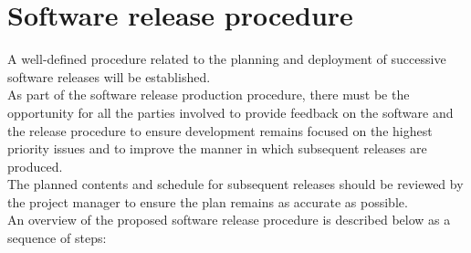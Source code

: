 \section{Software release procedure}

\noindent A well-defined procedure related to the planning and deployment of successive software releases will be established.\\

\noindent As part of the software release production procedure, there must be the opportunity for all the parties involved to provide feedback on the software and the release procedure to ensure development remains focused on the highest priority issues and to improve the manner in which subsequent releases are produced.\\

\noindent The planned contents and schedule for subsequent releases should be reviewed by the project manager to ensure the plan remains as accurate as possible.\\

\noindent An overview of the proposed software release procedure is described below as a sequence of steps:


